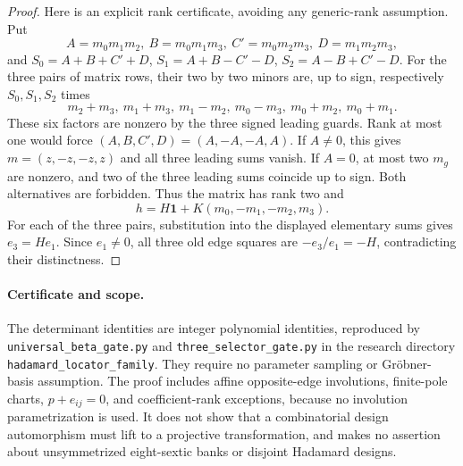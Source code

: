 \begin{proof}
Here is an explicit rank certificate, avoiding any generic-rank
assumption. Put
\[
 A=m_0m_1m_2,\ B=m_0m_1m_3,\ C'=m_0m_2m_3,\ D=m_1m_2m_3,
\]
and $S_0=A+B+C'+D$, $S_1=A+B-C'-D$, $S_2=A-B+C'-D$.
For the three pairs of matrix rows, their two by two minors are, up to
sign, respectively $S_0,S_1,S_2$ times
\[
 m_2+m_3,\ m_1+m_3,\ m_1-m_2,\ m_0-m_3,\ m_0+m_2,\ m_0+m_1.
\]
These six factors are nonzero by the three signed leading guards.
Rank at most one would force $(A,B,C',D)=(A,-A,-A,A)$.
If $A\ne0$, this gives $m=(z,-z,-z,z)$ and all three leading sums
vanish. If $A=0$, at most two $m_g$ are nonzero, and two of the three
leading sums coincide up to sign. Both alternatives are forbidden.
Thus the matrix has rank two and
\[
 h=H\mathbf1+K(m_0,-m_1,-m_2,m_3).
\]
For each of the three pairs, substitution into the displayed elementary
sums gives $e_3=He_1$. Since $e_1\ne0$, all three old edge squares are
$-e_3/e_1=-H$, contradicting their distinctness.
\end{proof}

\paragraph{Certificate and scope.}
The determinant identities are integer polynomial identities, reproduced
by \texttt{universal\_beta\_gate.py} and
\texttt{three\_selector\_gate.py} in the research directory
\texttt{hadamard\_locator\_family}. They require no parameter sampling or
Gr\"obner-basis assumption. The proof includes affine opposite-edge
involutions, finite-pole charts, $p+e_{ij}=0$, and coefficient-rank
exceptions, because no involution parametrization is used. It does not
show that a combinatorial design automorphism must lift to a projective
transformation, and makes no assertion about unsymmetrized eight-sextic
banks or disjoint Hadamard designs.
